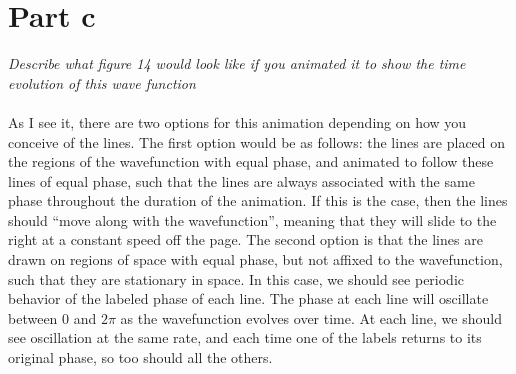 \documentclass[11pt, a4paper]{article}
\begin{document}
\section{Part c} \emph{Describe what figure 14 would look like if you animated 
                       it to show the time evolution of this wave function}
\\ \hfill \\
As I see it, there are two options for this animation depending on how you
conceive of the lines. The first option would be as follows: the lines are
placed on the regions of the wavefunction with equal phase, and animated to 
follow these lines of equal phase, such that the lines are always associated
with the same phase throughout the duration of the animation. If this is the
case, then the lines should ``move along with the wavefunction'', meaning that 
they will slide to the right at a constant speed off the page. The second option
is that the lines are drawn on regions of space with equal phase, but not
affixed to the wavefunction, such that they are stationary in space. In this
case, we should see periodic behavior of the labeled phase of each line. The 
phase at each line will oscillate between $0$ and $2\pi$ as the wavefunction
evolves over time. At each line, we should see oscillation at the same rate, and
each time one of the labels returns to its original phase, so too should all the
others.
\end{document}
